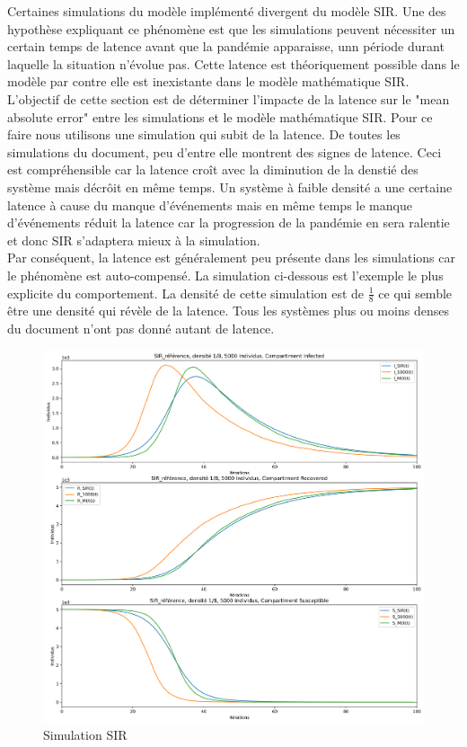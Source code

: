 Certaines simulations du modèle implémenté divergent du modèle SIR. Une des hypothèse expliquant ce phénomène est que les simulations peuvent nécessiter un certain temps de latence avant que la pandémie apparaisse, unn période durant laquelle la situation n'évolue pas. Cette latence est théoriquement possible dans le modèle par contre elle est inexistante dans le modèle mathématique SIR.\\

L'objectif de cette section est de déterminer l'impacte de la latence sur le "mean absolute error" entre les simulations et le modèle mathématique SIR. Pour ce faire nous utilisons une simulation qui subit de la latence. De toutes les simulations du document, peu d'entre elle montrent des signes de latence. Ceci est compréhensible car la latence croît avec la diminution de la denstié des système mais décrôit en même temps. Un système à faible densité a une certaine latence à cause du manque d'événements mais en même temps le manque d'événements réduit la latence car la progression de la pandémie en sera ralentie et donc SIR s'adaptera mieux à la simulation.\\

Par conséquent, la latence est généralement peu présente dans les simulations car le phénomène est auto-compensé. La simulation ci-dessous est l'exemple le plus explicite du comportement. La densité de cette simulation est de $\frac{1}{8}$ ce qui semble être une densité qui révèle de la latence. Tous les systèmes plus ou moins denses du document n'ont pas donné autant de latence.

\newpage

\begin{figure}[h]
	\centering
	\captionsetup{justification=centering}
	\includegraphics[width=.6\textwidth]{Images/SIR_ref_8_5.png}
	\caption{Simulation SIR}
\end{figure}

